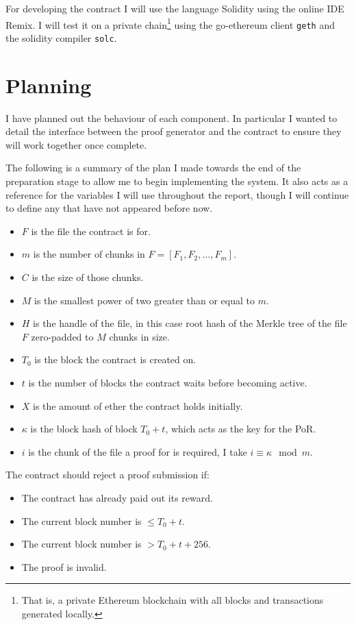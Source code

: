\documentclass[12pt,a4paper,twoside,openright]{report}
\begin{document}
For developing the contract I will use the language Solidity using the online IDE Remix\cite{browser-solidity}.
I will test it on a private chain\footnote{That is, a private Ethereum blockchain with all blocks and transactions generated locally.}
using the go-ethereum client \texttt{geth} and the solidity compiler \texttt{solc}.


\section{Planning}\label{plan}

I have planned out the behaviour of each component.
In particular I wanted to detail the interface between the proof generator and the contract
to ensure they will work together once complete.

The following is a summary of the plan I made towards the end of the preparation stage to allow me to begin implementing the system.
It also acts as a reference for the variables I will use throughout the report, though I will continue to define any that have not appeared before now.

\begin{itemize}
\item $F$ is the file the contract is for.
\item $m$ is the number of chunks in $F = [F_1, F_2, \ldots, F_m]$.
\item $C$ is the size of those chunks.
\item $M$ is the smallest power of two greater than or equal to $m$.
\item $H$ is the handle of the file, in this case root hash of the Merkle tree of the file $F$ zero-padded to $M$ chunks in size.
\item $T_0$ is the block the contract is created on.
\item $t$ is the number of blocks the contract waits before becoming active.
\item $X$ is the amount of ether the contract holds initially.
\item $\kappa$ is the block hash of block $T_0 + t$, which acts as the key for the PoR.
\item $i$ is the chunk of the file a proof for is required, I take $i \equiv \kappa \mod m$.
\end{itemize}

The contract should reject a proof submission if:

\begin{itemize}
\item The contract has already paid out its reward.
\item The current block number is $\leq T_0 + t$.
\item The current block number is $> T_0 + t + 256$.
\item The proof is invalid.
\end{itemize}
\end{document}
